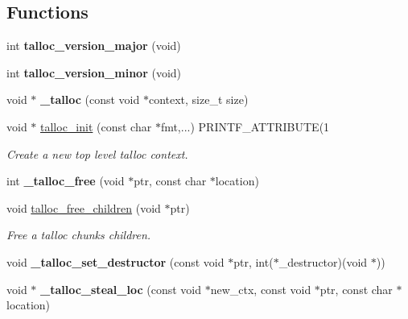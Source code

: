 \subsection*{Functions}
\begin{DoxyCompactItemize}
\item 
\hypertarget{group__talloc_gaec179ec7cec2f22979ed6ae8ead16ba3}{}int {\bfseries talloc\+\_\+version\+\_\+major} (void)\label{group__talloc_gaec179ec7cec2f22979ed6ae8ead16ba3}

\item 
\hypertarget{group__talloc_ga6ffad371cc3a041d8c25b1350040dab4}{}int {\bfseries talloc\+\_\+version\+\_\+minor} (void)\label{group__talloc_ga6ffad371cc3a041d8c25b1350040dab4}

\item 
\hypertarget{group__talloc_ga9166458454d5a321e9fab486b1984f31}{}void $\ast$ {\bfseries \+\_\+talloc} (const void $\ast$context, size\+\_\+t size)\label{group__talloc_ga9166458454d5a321e9fab486b1984f31}

\item 
void $\ast$ \hyperlink{group__talloc_ga4f4a621ca5763f779d011d88b869bbeb}{talloc\+\_\+init} (const char $\ast$fmt,...) P\+R\+I\+N\+T\+F\+\_\+\+A\+T\+T\+R\+I\+B\+U\+T\+E(1
\begin{DoxyCompactList}\small\item\em Create a new top level talloc context. \end{DoxyCompactList}\item 
\hypertarget{group__talloc_gabbd2cd2e00cf25ccfb4ed112b37128ab}{}int {\bfseries \+\_\+talloc\+\_\+free} (void $\ast$ptr, const char $\ast$location)\label{group__talloc_gabbd2cd2e00cf25ccfb4ed112b37128ab}

\item 
void \hyperlink{group__talloc_ga939926bc6d0d87e1f223a993decb70e9}{talloc\+\_\+free\+\_\+children} (void $\ast$ptr)
\begin{DoxyCompactList}\small\item\em Free a talloc chunk\textquotesingle{}s children. \end{DoxyCompactList}\item 
\hypertarget{group__talloc_ga1727514444a8b582af5c71a105c2c109}{}void {\bfseries \+\_\+talloc\+\_\+set\+\_\+destructor} (const void $\ast$ptr, int($\ast$\+\_\+destructor)(void $\ast$))\label{group__talloc_ga1727514444a8b582af5c71a105c2c109}

\item 
\hypertarget{group__talloc_gaa710048b3463fe968260882814428471}{}void $\ast$ {\bfseries \+\_\+talloc\+\_\+steal\+\_\+loc} (const void $\ast$new\+\_\+ctx, const void $\ast$ptr, const char $\ast$location)\label{group__talloc_gaa710048b3463fe968260882814428471}


\end{DoxyCompactItemize}
